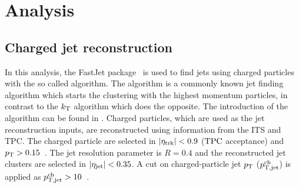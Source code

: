 \section{Analysis}
\label{Sec:Analysis}

\subsection{Charged jet reconstruction}
\label{SubSec:JetRec}

In this analysis, the FastJet package~\cite{Cacciari:2011ma} is used to find jets using charged particles with the so called \akT algorithm. The \akT algorithm is a commonly known jet finding algorithm which starts the clustering with the highest momentum particles, in contrast to the $k_{\rm T}$ algorithm which does the opposite. The introduction of the algorithm can be found in \cite{Cacciari:2008gp}. Charged particles, which are used as the jet reconstruction inputs, are reconstructed using information from the ITS and TPC. The charged particle are selected in $\left|\eta_{\rm trk}\right| < 0.9$ ($\rm{TPC}$ acceptance) and $p_{\rm T}> 0.15$~\GeVc. The jet resolution parameter is $R = 0.4$ and the reconstructed jet clusters are selected in $\left|\eta_{\rm jet}\right| < 0.35$. A cut on charged-particle jet $p_{\rm T}$ ($p_{\rm T,jet}^{\rm ch}$) is applied as $p_{\rm T,jet}^{\rm ch} > 10$~\GeVc.

